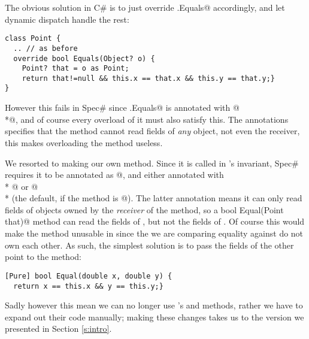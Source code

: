 The obvious solution in C\# is to just override \Q@Object.Equals@ accordingly, and let dynamic dispatch handle the rest:
\begin{lstlisting}
class Point {
  .. // as before
  override bool Equals(Object? o) {
    Point? that = o as Point;
    return that!=null && this.x == that.x && this.y == that.y;}
}
\end{lstlisting}

However this fails in Spec\# since \Q@Object.Equals@ is annotated with \Q@[Pure]@\\*@, and of course every overload of it must also satisfy this. The \Q@Reads@ annotations specifies that the method cannot read fields of \emph{any} object, not even the receiver, this makes overloading the method useless.

We resorted to making our own \Q@Equal@ method. Since it is called in \Q@Cage@'s invariant, Spec\# requires it to be annotated as \Q@[Pure]@, and either annotated with\\* @ or @\\* (the default, if the method is \Q@[Pure]@). The latter annotation means it can only read fields of objects owned by the \emph{receiver} of the method, so a \Q@[Pure] bool Equal(Point that)@ method can read the fields of \Q@this@, but not the fields of \Q@that@. Of course this would make the method unusable in \Q@Cage@ since the \Q@Point@s we are comparing equality against do not own each other. As such, the simplest solution is to  pass the fields of the other point to the method:
\begin{lstlisting}
[Pure] bool Equal(double x, double y) {
  return x == this.x && y == this.y;}
\end{lstlisting}

Sadly however this mean we can no longer use \Q@List@'s \Q@Contains@ and \Q@IndexOf@ methods, rather we have to expand out their code manually; making these changes takes us to the version we presented in Section \ref{s:intro}.

\lstset{language=FortyTwo}
